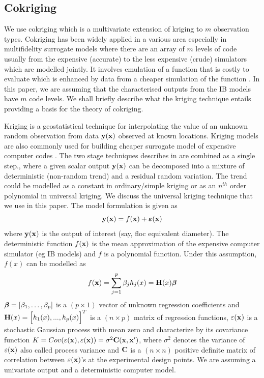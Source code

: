 \subsection{Cokriging}\label{cokk}
We use cokriging which is a multivariate extension of kriging to $m$ observation types. Cokriging has been widely applied in a various area especially in multifidelity surrogate models where there are an array of $m$ levels of code usually from the expensive (accurate) to the less expensive (crude) simulators which are modelled jointly. It involves emulation of a function that is costly to evaluate which is enhanced by data from a cheaper simulation of the function \citep{co3,co5}.  In this paper, we are assuming that the characterised outputs from the IB models have $m$ code levels. We shall briefly describe what the kriging technique entails providing a basis for the theory of cokriging.

Kriging is a geostatistical technique for interpolating the value of an unknown random observation from data ${\bf y}({\bf x})$ observed at known locations. Kriging models are also commonly used for building cheaper surrogate model of expensive computer codes \cite{pd1,pd2, pd3,pd6}. The two stage techniques describes in \citet{pd11} are combined as a single step., where a given scalar output ${\bf y}({\bf x})$ can be decomposed into a mixture of deterministic (non-random trend) and a residual random variation. The trend could be modelled as a constant in ordinary/simple kriging or as an $n^{th}$ order polynomial in universal kriging. We discuss the universal kriging technique that we use in this paper. The model formulation is given as
\begin{equation}\label{geneq2}
{\bf y}({\bf x})= f({\bf x}) + \boldsymbol \varepsilon({\bf x})
\end{equation}
where ${\bf y}({\bf x})$ is the output of interest (say, floc equivalent diameter). The deterministic function $f({\bf x})$ is the mean approximation of the expensive computer simulator (eg IB models) and $f$ is a polynomial function. Under this assumption, $f(x)$ can be modelled as
\begin{equation}
f({\bf x}) = \sum_{j=1}^{p} \beta_j h_j(x) ={\bf H}(x) {\boldsymbol{\beta}}
\end{equation}
${\boldsymbol{\beta}}=[\beta_1,\ldots,\beta_p]$ is a $(p\times 1)$ vector of unknown regression coefficients and ${\bf H}(x) = \Big[h_1(x), . . . , h_p(x)\Big]^T$ is a $(n\times p)$ matrix of regression functions,
$\varepsilon({\bf x})$ is a stochastic Gaussian process with mean zero and characterize by its covariance function
$K=Cov(\varepsilon({\bf x}),\varepsilon({\bf x})) = \sigma^2{\bf C}({\bf x},{\bf x}')$, where $\sigma^2$ denotes the variance of $\varepsilon({\bf x})$ also called process variance and ${\bf C}$ is a $(n\times n)$ positive definite matrix of correlation between $\varepsilon({\bf x})$'s at the experimental design points. We are assuming a univariate output and a deterministic computer model.

